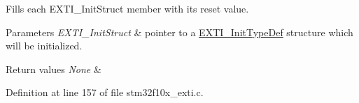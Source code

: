 Fills each E\+X\+T\+I\+\_\+\+Init\+Struct member with its reset value. 


\begin{DoxyParams}{Parameters}
{\em E\+X\+T\+I\+\_\+\+Init\+Struct} & pointer to a \hyperlink{struct_e_x_t_i___init_type_def}{E\+X\+T\+I\+\_\+\+Init\+Type\+Def} structure which will be initialized. \\
\hline
\end{DoxyParams}

\begin{DoxyRetVals}{Return values}
{\em None} & \\
\hline
\end{DoxyRetVals}


Definition at line 157 of file stm32f10x\+\_\+exti.\+c.

